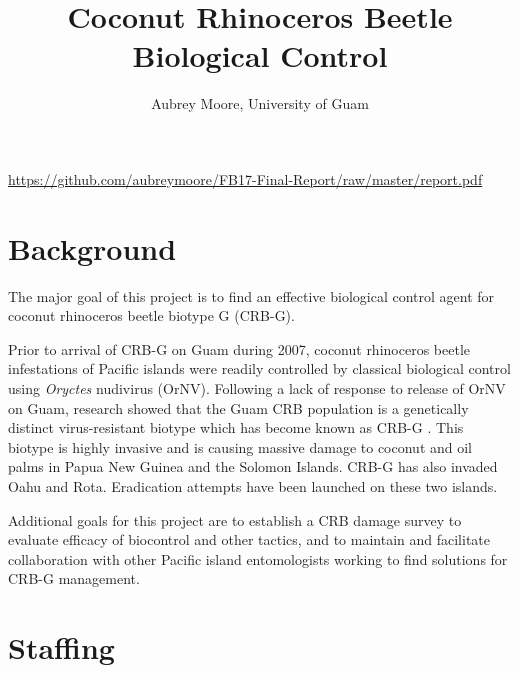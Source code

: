 \documentclass[12pt,letterpaper,english,bibliography=totocnumbered]{scrartcl}
\begin{document}
\titlehead{USDA APHIS Grant AP17PPQFO000C312\\
Final Report\\
Report ID: AP17PPQFO000C312-PE-Final-19\\
Performance Period: August 1, 2017 - July 31, 2019}
\title{Coconut Rhinoceros Beetle Biological Control}
\author{Aubrey Moore, University of Guam}
\maketitle


\begin{center}
\url{https://github.com/aubreymoore/FB17-Final-Report/raw/master/report.pdf}
\end{center}

\newpage
\tableofcontents{}

\newpage
\section{Background}

The major goal of this project is to find an effective biological
control agent for coconut rhinoceros beetle biotype G (CRB-G).

Prior to arrival of CRB-G on Guam during 2007, coconut rhinoceros beetle
infestations of Pacific islands were readily controlled by classical
biological control using \textit{Oryctes} nudivirus (OrNV). Following a lack
of response to release of OrNV on Guam, research showed that the Guam
CRB population is a genetically distinct virus-resistant biotype which
has become known as CRB-G \cite{marshall_new_2017-1}. This biotype is highly invasive and is
causing massive damage to coconut and oil palms in Papua New Guinea
and the Solomon Islands. CRB-G has also invaded Oahu and Rota. Eradication
attempts have been launched on these two islands.

Additional goals for this project are to establish a CRB damage survey to evaluate efficacy of biocontrol and other tactics, and to maintain and facilitate collaboration with other Pacific island entomologists working to find solutions for CRB-G management.





\section{Staffing}
\end{document}
